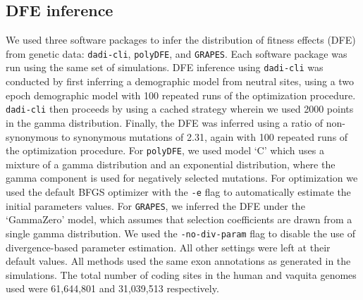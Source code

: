 \documentclass[hidelinks]{article}
\newcommand{\polydfe}{\texttt{polyDFE}\xspace}
\newcommand{\dadicli}{\texttt{dadi-cli}\xspace}
\newcommand{\grapes}{\texttt{GRAPES}\xspace}
\begin{document}
    \subsection*{DFE inference}
    We used three software packages to infer the distribution of fitness effects (DFE) from genetic data:
    \dadicli \citep{Huang2023,kim2017inference}, \polydfe \citep{tataru2020polydfe}, and \grapes \citep{galtier2016adaptive}.
    Each software package was run using the same set of simulations.
    DFE inference using \dadicli was conducted by first inferring a demographic model from neutral sites,
    using a two epoch demographic model with 100 repeated runs of the optimization procedure.
    \dadicli then proceeds by using a cached strategy wherein we used 2000 points in the gamma distribution.
    Finally, the DFE was inferred using a ratio of non-synonymous to synonymous mutations of 2.31, again with
    100 repeated runs of the optimization procedure.
    For \polydfe, we used model `C' which uses a mixture of a gamma distribution and an exponential distribution,
    where the gamma component is used for negatively selected mutations. For optimization we used
    the default BFGS optimizer with the \texttt{-e} flag to automatically estimate the initial parameters values.
    For \grapes, we inferred the DFE under the `GammaZero' model, which assumes that selection coefficients
    are drawn from a single gamma distribution. We used the \texttt{-no-div-param} flag to disable the use
    of divergence-based parameter estimation. All other settings were left at their default values.
    All methods used the same exon annotations as generated in the simulations. The total number of coding sites
    in the human and vaquita genomes used were 61,644,801 and 31,039,513 respectively.
\end{document}

